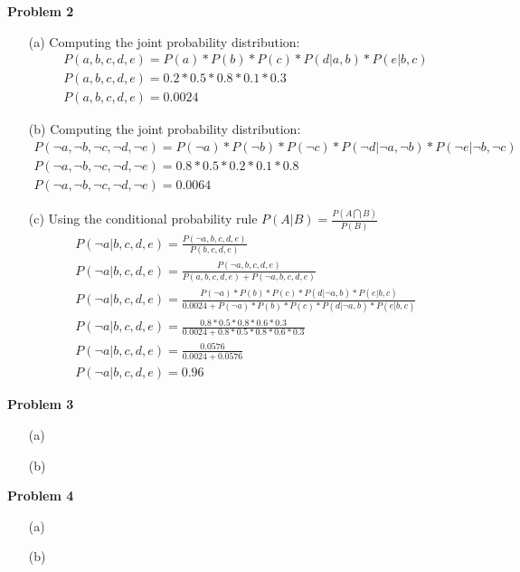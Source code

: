 \documentclass[11pt]{article}
\begin{document}
    \begin{center}
        \Large
        \textbf{Problem 2}
    \end{center}
    \normalsize
    \begin{enumerate}
        \item[(a)] Computing the joint probability distribution:
            \begin{gather*}
                P(a, b, c, d, e) = P(a)*P(b)*P(c)*P(d|a,b)*P(e|b,c)\\
                P(a, b, c, d, e) = 0.2*0.5*0.8*0.1*0.3\\
                P(a, b, c, d, e) = 0.0024
            \end{gather*}
        \item[(b)] Computing the joint probability distribution:
            \begin{gather*}
                P(\neg{a}, \neg{b}, \neg{c}, \neg{d}, \neg{e}) = P(\neg{a})*P(\neg{b})*P(\neg{c})*P(\neg{d}|\neg{a},\neg{b})*P(\neg{e}|\neg{b},\neg{c})\\
                P(\neg{a}, \neg{b}, \neg{c}, \neg{d}, \neg{e}) = 0.8*0.5*0.2*0.1*0.8\\
                P(\neg{a}, \neg{b}, \neg{c}, \neg{d}, \neg{e}) = 0.0064
            \end{gather*}
        \item[(c)] Using the conditional probability rule $P(A|B) = \frac{P(A\bigcap B)}{P(B)}$
            \begin{gather*}
                P(\neg{a} | b, c, d, e) = \frac{P(\neg{a}, b, c, d, e)}{P(b, c, d, e)}\\
                P(\neg{a} | b, c, d, e) = \frac{P(\neg{a}, b, c, d, e)}{P(a, b, c, d, e) + P(\neg{a}, b, c, d, e)}\\
                P(\neg{a} | b, c, d, e) = \frac{P(\neg{a})*P(b)*P(c)*P(d|\neg{a},b)*P(e|b,c)}{0.0024 + P(\neg{a})*P(b)*P(c)*P(d|\neg{a},b)*P(e|b,c)}\\
                P(\neg{a} | b, c, d, e) = \frac{0.8*0.5*0.8*0.6*0.3}{0.0024 + 0.8*0.5*0.8*0.6*0.3}\\
                P(\neg{a} | b, c, d, e) = \frac{0.0576}{0.0024 + 0.0576}\\
                P(\neg{a} | b, c, d, e) = 0.96
            \end{gather*}
    \end{enumerate}

    \begin{center}
        \Large
        \textbf{Problem 3}
    \end{center}
    \normalsize
    \begin{enumerate}
        \item[(a)]
        \item[(b)]
    \end{enumerate}

    \begin{center}
        \Large
        \textbf{Problem 4}
    \end{center}
    \normalsize
    \begin{enumerate}
        \item[(a)]
        \item[(b)]
    \end{enumerate}
\end{document}
